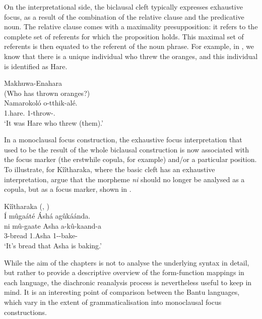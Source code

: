 \documentclass[output=paper]{langscibook}
\begin{document}
On the interpretational side, the biclausal cleft typically expresses exhaustive focus, as a result of the combination of the relative clause and the predicative noun. The relative clause comes with a maximality presupposition: it refers to the complete set of referents for which the proposition holds. This maximal set of referents is then equated to the referent of the noun phrase. For example, in , we know that there is a unique individual who threw the oranges, and this individual is identified as Hare.

\ea
\label{bkm:Ref125387736}
Makhuwa-Enahara \citep[172]{vanderWal2009}\\
(Who has thrown oranges?)\\
\gll
Namarokoló  o-tthik-alé.\\
1.hare.\PRL{}  1-throw-\PFV.\REL{}\\
\glt
‘It was Hare who threw (them).’\\


\z

In a monoclausal focus construction, the exhaustive focus interpretation that used to be the result of the whole biclausal construction is now associated with the focus marker (the erstwhile copula, for example) and/or a particular position. To illustrate, for Kîîtharaka, where the basic cleft has an exhaustive interpretation, \citet{AbelsMuriungi2008} argue that the morpheme \textit{ni} should no longer be analysed as a copula, but as a focus marker, shown in .\largerpage[-1]\pagebreak

\ea
Kîîtharaka (, \cite{chapters/kiitharaka})\\
\label{bkm:Ref134538593}\'{I} mûgaáté Áshá agûkáánda.\\
\gll
ni  mû-gaate  Asha  a-kû-kaand-a\\
\FOC{}  3-bread  1.Asha  1\SM-\PRS-{}bake-\FV{}\\
\glt
‘It’s bread that Asha is baking.’\\


\z

While the aim of the chapters is not to analyse the underlying syntax in detail, but rather to provide a descriptive overview of the form-function mappings in each language, the diachronic reanalysis process is nevertheless useful to keep in mind. It is an interesting point of comparison between the Bantu languages, which vary in the extent of grammaticalisation into monoclausal focus constructions.
\end{document}
